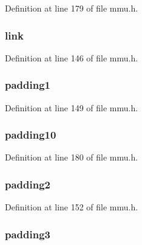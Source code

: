 Definition at line 179 of file mmu.\-h.

\hypertarget{structtaskstate_ae657c87971475ad47724bbcf3e4537e6}{
\subsubsection[{link}]{ link}}\label{structtaskstate_ae657c87971475ad47724bbcf3e4537e6}


Definition at line 146 of file mmu.\-h.

\hypertarget{structtaskstate_af1bf63d9df475699143c50918af7c3b9}{
\subsubsection[{padding1}]{ padding1}}\label{structtaskstate_af1bf63d9df475699143c50918af7c3b9}


Definition at line 149 of file mmu.\-h.

\hypertarget{structtaskstate_a0e4fcccb122d695f00f5df0ad14e6c3b}{
\subsubsection[{padding10}]{ padding10}}\label{structtaskstate_a0e4fcccb122d695f00f5df0ad14e6c3b}


Definition at line 180 of file mmu.\-h.

\hypertarget{structtaskstate_a352099edda0c7698cf5f352878346448}{
\subsubsection[{padding2}]{ padding2}}\label{structtaskstate_a352099edda0c7698cf5f352878346448}


Definition at line 152 of file mmu.\-h.

\hypertarget{structtaskstate_a1d1a645b86f97ca1844887d6178675aa}{
\subsubsection[{padding3}]{ padding3}}\label{structtaskstate_a1d1a645b86f97ca1844887d6178675aa}


